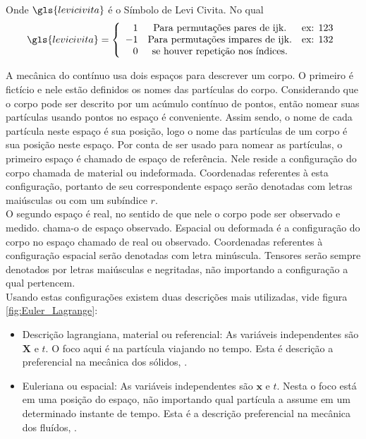Onde $ \gls{levicivita} $ é o Símbolo de Levi Civita. No qual 
\begin{equation}
    \gls{levicivita} = \left \{ \begin{array}{rcl}
       1  & \mbox{Para permutações pares de ijk.} & \mbox{ex: } 123  \\
       -1  & \mbox{Para permutações impares de ijk.} & \mbox{ex: } 132  \\
       0  & \mbox{se houver repetição nos índices.} 
    \end{array} \right.
\end{equation}

A mecânica do contínuo usa dois espaços para descrever um corpo. O primeiro é fictício e nele estão definidos os nomes das partículas do corpo. Considerando que o corpo pode ser descrito por um acúmulo contínuo de pontos, então nomear suas partículas usando pontos no espaço é conveniente. Assim sendo, o nome de cada partícula neste espaço é sua posição, logo o nome das partículas de um corpo é sua posição neste espaço. Por conta de ser usado para nomear as partículas, o primeiro espaço é chamado de espaço de referência. Nele reside a configuração do corpo chamada de material ou indeformada. Coordenadas referentes à esta configuração, portanto de seu correspondente espaço serão denotadas com letras maiúsculas ou com um subíndice $r$. \\

O segundo espaço é real, no sentido de que nele o corpo pode ser observado e medido. \cite{gurtin_fried_anand_2013} chama-o de espaço observado. Espacial ou deformada é a configuração do corpo no espaço chamado de real ou observado. Coordenadas referentes à configuração espacial serão denotadas com letra minúscula. Tensores serão sempre denotados por letras maiúsculas e negritadas, não importando a configuração a qual pertencem. \\

Usando estas configurações existem duas descrições mais utilizadas, vide figura \ref{fig:Euler_Lagrange}:
\begin{itemize}
    \item Descrição lagrangiana, material ou referencial: As variáveis independentes são $ \boldsymbol{X} $ e $ t$. O foco aqui é na partícula viajando no tempo. Esta é descrição a preferencial na mecânica dos sólidos, \cite{hiermaier_2008}.
    \item Euleriana ou espacial: As variáveis independentes são $ \boldsymbol{x} $ e $ t $. Nesta o foco está em uma posição do espaço, não importando qual partícula a assume em um determinado instante de tempo. Esta é a descrição preferencial na mecânica dos fluídos, \cite{hiermaier_2008}.
\end{itemize}

